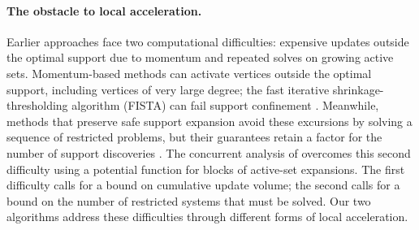 \paragraph{The obstacle to local acceleration.}
Earlier approaches face two computational difficulties: expensive updates
outside the optimal support due to momentum and repeated solves on growing
active sets. Momentum-based methods can activate vertices outside the
optimal support, including vertices of very large degree; the fast iterative
shrinkage-thresholding algorithm (FISTA) can fail support confinement
\citep{fountoulakis2026complexity}. Meanwhile, methods that preserve safe
support expansion avoid these excursions by solving a sequence of restricted
problems, but their guarantees retain a factor for the number of support
discoveries \citep{martinezrubio2023accelerated,wei2026simple}. The concurrent
analysis of \citet{cui2026accelerating} overcomes this second difficulty
using a potential function for blocks of active-set expansions. The first
difficulty calls for a bound on cumulative update volume; the second calls
for a bound on the number of restricted systems that must be solved. Our two
algorithms address these difficulties through different forms of local
acceleration.

